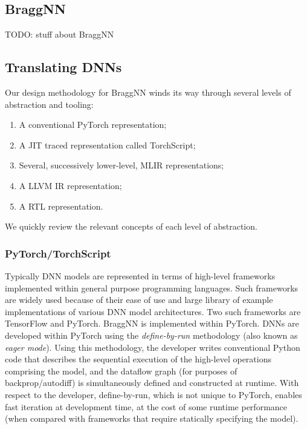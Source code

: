 \subsection{BraggNN}\label{subsec:braggnn}

TODO: stuff about BraggNN

\subsection{Translating DNNs}\label{subsec:translatingdnns}
Our design methodology for BraggNN winds its way through several levels of abstraction and tooling:

\begin{enumerate}
	\item A conventional PyTorch representation;
	\item A JIT traced representation called TorchScript;
	\item Several, successively lower-level, MLIR representations;
	\item A LLVM IR representation;
	\item A RTL representation.
\end{enumerate}

We quickly review the relevant concepts of each level of abstraction.

\subsubsection{PyTorch/TorchScript}\label{subsec:pytorch}

Typically DNN models are represented in terms of high-level frameworks implemented within general purpose programming languages.
Such frameworks are widely used because of their ease of use and large library of example implementations of various DNN model architectures.
Two such frameworks are TensorFlow and PyTorch.
BraggNN is implemented within PyTorch.
DNNs are developed within PyTorch using the \emph{define-by-run} methodology (also known as \emph{eager mode}).
Using this methodology, the developer writes conventional Python code that describes the sequential execution of the high-level operations comprising the model, and the dataflow graph (for purposes of backprop/autodiff) is simultaneously defined and constructed at runtime.
With respect to the developer, define-by-run, which is not unique to PyTorch, enables fast iteration at development time, at the cost of some runtime performance (when compared with frameworks that require statically specifying the model).

